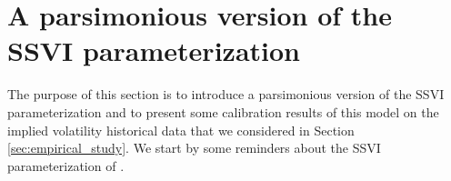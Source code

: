 \section{A parsimonious version of the SSVI parameterization}\label{sec:svi}
The purpose of this section is to introduce a parsimonious version of the SSVI parameterization and to present some calibration results of this model on the implied volatility historical data that we considered in Section \ref{sec:empirical_study}. We start by some reminders about the SSVI parameterization of \cite{gatheral2014arbitrage}. 



